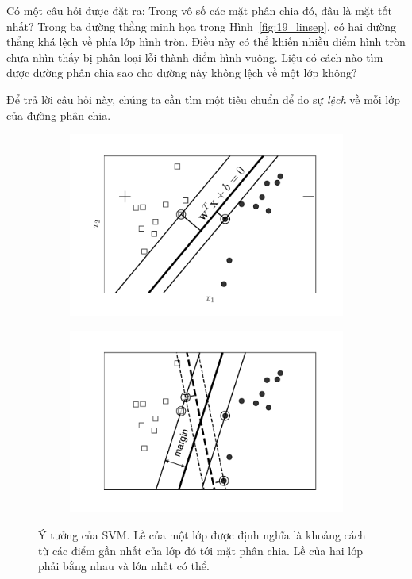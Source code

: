 Có một câu hỏi được đặt ra: Trong vô số các mặt phân chia đó, đâu là mặt
tốt nhất? Trong ba đường thẳng minh họa trong Hình~\ref{fig:19_linsep}, có hai
đường thẳng khá lệch về phía lớp hình tròn. Điều này có thể khiến nhiều điểm hình tròn chưa nhìn thấy bị phân loại lỗi thành điểm hình vuông. Liệu có
cách nào tìm được đường phân chia sao cho đường này không lệch về một lớp không?

Để trả lời câu hỏi này, chúng ta cần tìm một tiêu chuẩn để đo sự \textit{lệch} về mỗi lớp của đường phân chia.
\begin{figure}[t]
\begin{subfigure}{0.49\textwidth}
\includegraphics[width=0.99\linewidth]{ebookML_src/src/svm/svm2.pdf}
\caption{}
\end{subfigure}
\begin{subfigure}{0.49\textwidth}
\includegraphics[width=0.99\linewidth]{ebookML_src/src/svm/svm5.pdf}
\caption{}
\end{subfigure}
\caption{Ý tưởng của SVM. Lề của một lớp được
định nghĩa là khoảng cách từ các điểm gần nhất của lớp đó tới mặt phân
chia. Lề của hai lớp phải bằng nhau và lớn nhất có thể.}
\label{fig:19_svm2}
\end{figure}
